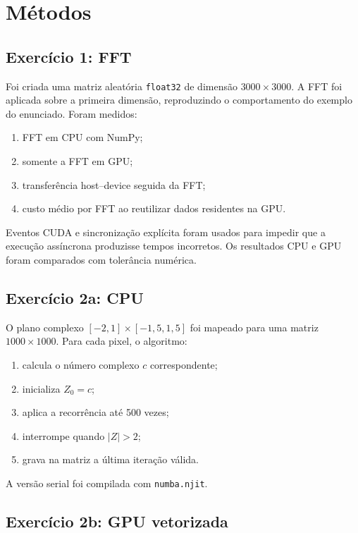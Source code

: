 \section{Métodos}

\subsection{Exercício 1: FFT}

Foi criada uma matriz aleatória \texttt{float32} de dimensão
$3000\times3000$. A FFT foi aplicada sobre a primeira dimensão, reproduzindo o
comportamento do exemplo do enunciado. Foram medidos:

\begin{enumerate}
    \item FFT em CPU com NumPy;
    \item somente a FFT em GPU;
    \item transferência host--device seguida da FFT;
    \item custo médio por FFT ao reutilizar dados residentes na GPU.
\end{enumerate}

Eventos CUDA e sincronização explícita foram usados para impedir que a
execução assíncrona produzisse tempos incorretos. Os resultados CPU e GPU
foram comparados com tolerância numérica.

\subsection{Exercício 2a: CPU}

O plano complexo $[-2,1]\times[-1{,}5,1{,}5]$ foi mapeado para uma matriz
$1000\times1000$. Para cada pixel, o algoritmo:

\begin{enumerate}
    \item calcula o número complexo $c$ correspondente;
    \item inicializa $Z_0=c$;
    \item aplica a recorrência até 500 vezes;
    \item interrompe quando $|Z|>2$;
    \item grava na matriz a última iteração válida.
\end{enumerate}

A versão serial foi compilada com \texttt{numba.njit}.

\subsection{Exercício 2b: GPU vetorizada}

